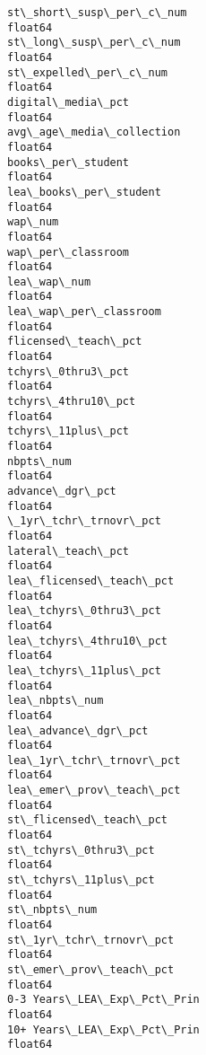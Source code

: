 \documentclass[11pt]{article}
\begin{document}
\begin{Verbatim}[commandchars=\\\{\}]
st\_short\_susp\_per\_c\_num                                         float64
st\_long\_susp\_per\_c\_num                                          float64
st\_expelled\_per\_c\_num                                           float64
digital\_media\_pct                                               float64
avg\_age\_media\_collection                                        float64
books\_per\_student                                               float64
lea\_books\_per\_student                                           float64
wap\_num                                                         float64
wap\_per\_classroom                                               float64
lea\_wap\_num                                                     float64
lea\_wap\_per\_classroom                                           float64
flicensed\_teach\_pct                                             float64
tchyrs\_0thru3\_pct                                               float64
tchyrs\_4thru10\_pct                                              float64
tchyrs\_11plus\_pct                                               float64
nbpts\_num                                                       float64
advance\_dgr\_pct                                                 float64
\_1yr\_tchr\_trnovr\_pct                                            float64
lateral\_teach\_pct                                               float64
lea\_flicensed\_teach\_pct                                         float64
lea\_tchyrs\_0thru3\_pct                                           float64
lea\_tchyrs\_4thru10\_pct                                          float64
lea\_tchyrs\_11plus\_pct                                           float64
lea\_nbpts\_num                                                   float64
lea\_advance\_dgr\_pct                                             float64
lea\_1yr\_tchr\_trnovr\_pct                                         float64
lea\_emer\_prov\_teach\_pct                                         float64
st\_flicensed\_teach\_pct                                          float64
st\_tchyrs\_0thru3\_pct                                            float64
st\_tchyrs\_11plus\_pct                                            float64
st\_nbpts\_num                                                    float64
st\_1yr\_tchr\_trnovr\_pct                                          float64
st\_emer\_prov\_teach\_pct                                          float64
0-3 Years\_LEA\_Exp\_Pct\_Prin                                      float64
10+ Years\_LEA\_Exp\_Pct\_Prin                                      float64

\end{Verbatim}
\end{document}
